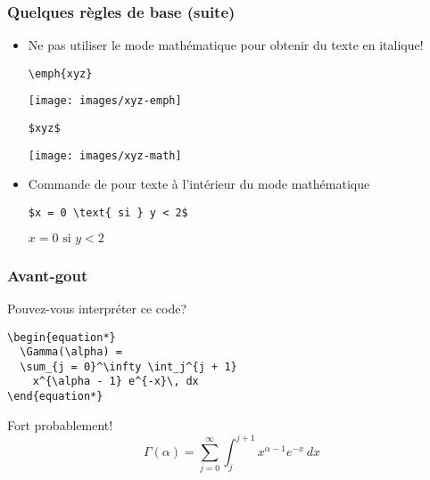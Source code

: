 \begin{frame}[fragile]
  \frametitle{Quelques règles de base (suite)}
  \begin{itemize}
  \item \alert{Ne pas} utiliser le mode mathématique pour obtenir du
    texte en italique!
    \begin{demo}
      \begin{minipage}{0.45\linewidth}
\begin{lstlisting}
\emph{xyz}
\end{lstlisting}
      \end{minipage}
      \hfill
      \begin{minipage}{0.45\linewidth}
        \texttt{[image: images/xyz-emph]}
      \end{minipage}\par
      \begin{minipage}{0.45\linewidth}
\begin{lstlisting}
$xyz$
\end{lstlisting}
      \end{minipage}
      \hfill
      \begin{minipage}{0.45\linewidth}
        \texttt{[image: images/xyz-math]}
      \end{minipage}
    \end{demo}
  \item Commande  de  pour texte à
    l'intérieur du mode mathématique
    \begin{demo}
      \begin{texample}
\begin{lstlisting}
$x = 0 \text{ si } y < 2$
\end{lstlisting}
        \producing
        $x = 0 \text{ si } y < 2$
      \end{texample}
    \end{demo}
  \end{itemize}
\end{frame}

\begin{frame}[fragile]
  \frametitle{Avant-gout}

  Pouvez-vous interpréter ce code?
\begin{lstlisting}
\begin{equation*}
  \Gamma(\alpha) =
  \sum_{j = 0}^\infty \int_j^{j + 1}
    x^{\alpha - 1} e^{-x}\, dx
\end{equation*}
\end{lstlisting}
  \vspace{18pt}
  \pause

  Fort probablement!
  \begin{equation*}
    \Gamma(\alpha) =
    \sum_{j = 0}^\infty \int_j^{j + 1} x^{\alpha - 1} e^{-x}\, dx
  \end{equation*}
\end{frame}

